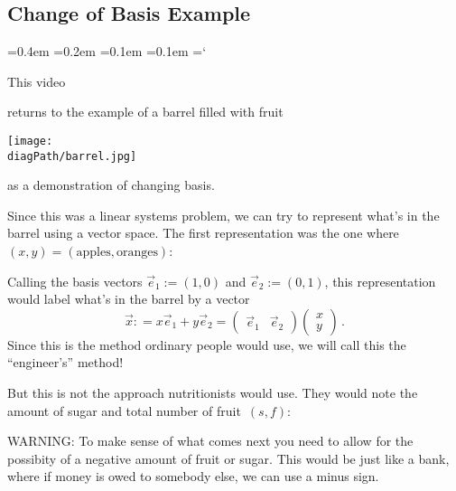 
\subsection*{Change of Basis Example}

{\ttfamily
{}\font=0.4em
\font=0.2em
\font=0.1em
\font=0.1em
\hyphenchar\font=`\-


\hypertarget{scripts_diagonalization_basis}{This video} returns to 
the example of a barrel filled with fruit
\begin{center}
\texttt{[image: \\diagPath/barrel.jpg]}
\end{center}
as a demonstration of changing basis.

Since this was a linear systems problem, we can try to represent what's in the barrel using a vector space. The first representation was the one
where $(x,y)=(\mbox{apples},\mbox{oranges})$:
\vspace{2mm}
\begin{center}
\end{center}
Calling the basis vectors $\vec e_1:=(1,0)$ and $\vec e_2:=(0,1)$, 
this representation would label what's in the barrel by a vector 
\[
\vec x: = x \vec e_1 + y\vec e_2 = \begin{pmatrix}\vec e_1 & \vec e_2\end{pmatrix}\begin{pmatrix}x \\ y\end{pmatrix}\, .
\]
Since this is the method ordinary people would use, we will call this the
``engineer's'' method!


But this is not the approach nutritionists would use. They would note the amount of sugar and total number of fruit~$(s,f)$:
\begin{center}
\end{center}
WARNING: To make sense of what comes next you need to allow for the possibity of a negative amount of fruit or sugar. This would be just like a bank, where if money is owed to somebody else, we can use a minus sign.

}
